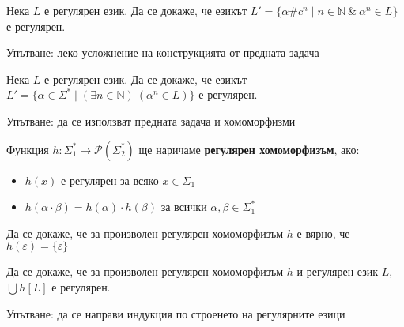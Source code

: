 \begin{problem}
Нека $L$ е регулярен език. Да се докаже, че езикът $L' = \{ \alpha \# c^n \mid n \in \mathbb{N} \: \& \: \alpha^n \in L \}$ е регулярен.

Упътване: леко усложнение на конструкцията от предната задача
\end{problem}

\begin{problem}
Нека $L$ е регулярен език. Да се докаже, че езикът $L' = \{ \alpha \in \Sigma^* \mid (\exists n \in \mathbb{N}) \: (\alpha^n \in L) \}$ е регулярен.

Упътване: да се използват предната задача и хомоморфизми
\end{problem}

\begin{definition}
    Функция $h : \Sigma_1^* \rightarrow \mathcal{P}(\Sigma_2^*)$ ще наричаме \textbf{регулярен хомоморфизъм}, ако:
    \begin{itemize}
        \item $h(x)$ е регулярен за всяко $x \in \Sigma_1$
        \item $h(\alpha \cdot \beta) = h(\alpha) \cdot h(\beta)$ за всички $\alpha, \beta \in \Sigma_1^*$
    \end{itemize}
\end{definition}

\begin{problem}
Да се докаже, че за произволен регулярен хомоморфизъм $h$ е вярно, че $h(\varepsilon) = \{ \varepsilon \}$
\end{problem}

\begin{problem}
Да се докаже, че за произволен регулярен хомоморфизъм $h$ и регулярен език $L$, $\bigcup h[L]$ е регулярен.

Упътване: да се направи индукция по строенето на регулярните езици
\end{problem}